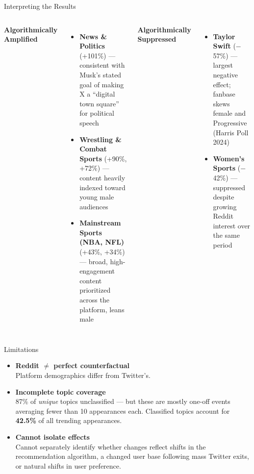 \documentclass[aspectratio=169,t]{beamer}
\newcommand{\orange}[1]{\textcolor{uteporange}{\textbf{#1}}}
\newcommand{\blue}[1]{\textcolor{utepblue}{\textbf{#1}}}
\begin{document}
\begin{frame}{Interpreting the Results}
\begin{columns}[T]
    \orange{Algorithmically Amplified}
    \vspace{0.3em}
    \begin{itemize}\setlength\itemsep{0.4em}\small
      \item \textbf{News \& Politics} (+101\%) — consistent with Musk's stated goal of making X a ``digital town square'' for political speech
      \item \textbf{Wrestling \& Combat Sports} (+90\%, +72\%) — content heavily indexed toward young male audiences
      \item \textbf{Mainstream Sports (NBA, NFL)} (+43\%, +34\%) — broad, high-engagement content prioritized across the platform, leans male
    \end{itemize}

    \blue{Algorithmically Suppressed}
    \vspace{0.3em}
    \begin{itemize}\setlength\itemsep{0.4em}\small
      \item \textbf{Taylor Swift} ($-$57\%) — largest negative effect; fanbase skews female and Progressive (Harris Poll 2024)
      \item \textbf{Women's Sports} ($-$42\%) — suppressed despite growing Reddit interest over the same period
    \end{itemize}

\end{columns}
\end{frame}

\begin{frame}{Limitations}
\begin{itemize}\setlength\itemsep{0.6em}
  \item \textbf{Reddit $\neq$ perfect counterfactual}\\
        \small Platform demographics differ from Twitter's. 

  \item \textbf{Incomplete topic coverage}\\
        \small 87\% of \textit{unique} topics unclassified — but these are mostly one-off events averaging fewer than 10 appearances each. Classified topics account for \orange{42.5\%} of all trending appearances.

  \item \textbf{Cannot isolate effects}\\
        \small Cannot separately identify whether changes reflect shifts in the recommendation algorithm, a changed user base following mass Twitter exits, or natural shifts in user preference.

\end{itemize}
\end{frame}
\end{document}
